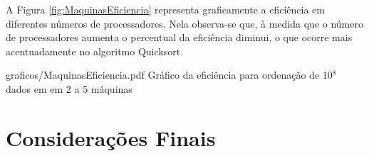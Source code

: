 


A Figura \ref{fig:MaquinasEficiencia} representa graficamente a eficiência em diferentes números de
processadores. Nela observa-se que, à medida que o número de processadores aumenta o percentual da
eficiência diminui, o que ocorre mais acentuadamente no algoritmo Quicksort. 

\begin{defaultFigure}{0.75\textwidth}{graficos/MaquinasEficiencia.pdf}
{Gráfico da eficiência para ordenação de 10$^8$ dados em em 2 a 5 máquinas}
\label{fig:MaquinasEficiencia}
\end{defaultFigure}

\section{Considerações Finais}
